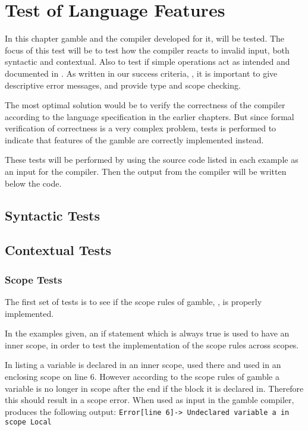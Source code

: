 \chapter{Test of Language Features}
\label{cha:test_of_language_features}
In this chapter \gls{gamble} and the compiler developed for it, will be tested.
The focus of this test will be to test how the compiler reacts to invalid input, both syntactic and contextual.
Also to test if simple operations act as intended and documented in . 
As written in our success criteria, , it is important to give descriptive error messages, and provide type and scope checking. 

The most optimal solution would be to verify the correctness of the compiler according to the language specification in the earlier chapters.
But since formal verification of correctness is a very complex problem, tests is performed to indicate that features of the \gls{gamble} are correctly implemented instead. \citep{Verification} 

These tests will be performed by using the source code listed in each example as an input for the compiler. 
Then the output from the compiler will be written below the code. 

\section{Syntactic Tests}

\section{Contextual Tests}

\subsection*{Scope Tests}
The first set of tests is to see if the scope rules of \gls{gamble}, , is properly implemented. 

In the examples given, an if statement which is always true is used to have an inner scope, in order to test the implementation of the scope rules across scopes. 

In listing  a variable is declared in an inner scope, used there and used in an enclosing scope on line 6.
However according to the scope rules of \gls{gamble} a variable is no longer in scope after the end if the block it is declared in. 
Therefore this should result in a scope error. 
When used as input in the \gls{gamble} compiler,  produces the following output: \texttt{Error[line    6]-> Undeclared variable a in scope Local}

